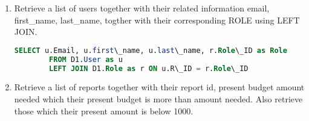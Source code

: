 \documentclass{article}
\begin{document}
\begin{enumerate}
  \item Retrieve a list of users together with their related information email, first\_name, last\_name, togther with their corresponding ROLE using LEFT JOIN.



    \begin{lstlisting}[language=SQL,
        keywordstyle=\color{blue},
        stringstyle=\color{mauve},
        showstringspaces=false,
        basicstyle=\ttfamily\footnotesize]
        SELECT u.Email, u.first\_name, u.last\_name, r.Role\_ID as Role
        FROM D1.User as u
        LEFT JOIN D1.Role as r ON u.R\_ID = r.Role\_ID
     \end{lstlisting}        
     
 \item Retrieve a list of reports together with their report id, 
present budget amount needed which their present budget is more than amount needed. 
Also retrieve those which their present amount is below 1000.




\end{enumerate}
\end{document}
